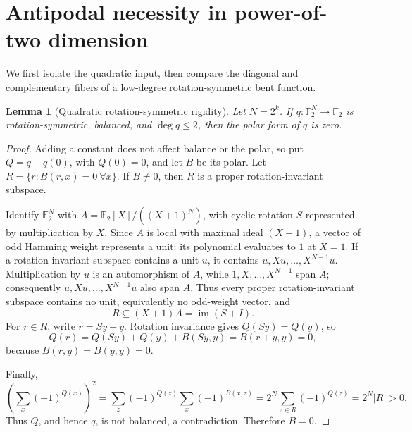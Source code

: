 \documentclass[11pt,a4paper]{article}
\newtheorem{lemma}[theorem]{Lemma}
\newcommand{\F}{\mathbb F_2}
\begin{document}
\section{Antipodal necessity in power-of-two dimension}

We first isolate the quadratic input, then compare the diagonal and complementary fibers of a low-degree rotation-symmetric bent function.

\begin{lemma}[Quadratic rotation-symmetric rigidity]\label{lem:quad-rigidity}
Let \(N=2^k\). If \(q:\F^N\to\F\) is rotation-symmetric, balanced, and \(\deg q\le2\), then the polar form of \(q\) is zero.
\end{lemma}
\begin{proof}
Adding a constant does not affect balance or the polar, so put \(Q=q+q(0)\), with \(Q(0)=0\), and let \(B\) be its polar. Let \(R=\{r:B(r,x)=0\ \forall x\}\). If \(B\ne0\), then \(R\) is a proper rotation-invariant subspace.

Identify \(\F^N\) with \(A=\F[X]/((X+1)^N)\), with cyclic rotation \(S\) represented by multiplication by \(X\). Since \(A\) is local with maximal ideal \((X+1)\), a vector of odd Hamming weight represents a unit: its polynomial evaluates to \(1\) at \(X=1\). If a rotation-invariant subspace contains a unit \(u\), it contains \(u,Xu,\ldots,X^{N-1}u\). Multiplication by \(u\) is an automorphism of \(A\), while \(1,X,\ldots,X^{N-1}\) span \(A\); consequently \(u,Xu,\ldots,X^{N-1}u\) also span \(A\). Thus every proper rotation-invariant subspace contains no unit, equivalently no odd-weight vector, and
\[
R\subseteq (X+1)A=\operatorname{im}(S+I).
\]
For \(r\in R\), write \(r=Sy+y\). Rotation invariance gives \(Q(Sy)=Q(y)\), so
\[
Q(r)=Q(Sy)+Q(y)+B(Sy,y)=B(r+y,y)=0,
\]
because \(B(r,y)=B(y,y)=0\).

Finally,
\[
\left(\sum_x(-1)^{Q(x)}\right)^2
=\sum_{z}(-1)^{Q(z)}\sum_x(-1)^{B(x,z)}
=2^N\sum_{z\in R}(-1)^{Q(z)}
=2^N|R|>0.
\]
Thus \(Q\), and hence \(q\), is not balanced, a contradiction. Therefore \(B=0\).
\end{proof}
\end{document}

